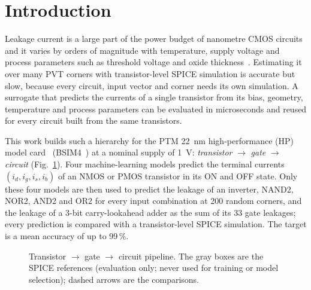 \section{Introduction}\label{sec:intro}
Leakage current is a large part of the power budget of nanometre CMOS circuits and it varies by orders of magnitude with temperature, supply voltage and process parameters such as threshold voltage and oxide thickness~\cite{roy2003}.
Estimating it over many PVT corners with transistor-level SPICE simulation is accurate but slow, because every circuit, input vector and corner needs its own simulation.
A surrogate that predicts the currents of a single transistor from its bias, geometry, temperature and process parameters can be evaluated in microseconds and reused for every circuit built from the same transistors.

This work builds such a hierarchy for the PTM \SI{22}{\nano\meter} high-performance (HP) model card~\cite{ptm,ptmweb} (BSIM4~\cite{bsim4}) at a nominal supply of \SI{1}{\volt}: \emph{transistor} $\rightarrow$ \emph{gate} $\rightarrow$ \emph{circuit} (Fig.~\ref{fig:flow}).
Four machine-learning models predict the terminal currents $(i_d,i_g,i_s,i_b)$ of an NMOS or PMOS transistor in its ON and OFF state. Only these four models are then used to predict the leakage of an inverter, NAND2, NOR2, AND2 and OR2 for every input combination at 200 random corners, and the leakage of a 3-bit carry-lookahead adder as the sum of its 33 gate leakages; every prediction is compared with a transistor-level SPICE simulation.
The target is a mean accuracy of up to 99\,\%.

\begin{figure}[t]
\centering
{}
\caption{Transistor $\rightarrow$ gate $\rightarrow$ circuit pipeline. The gray boxes are the SPICE references (evaluation only; never used for training or model selection); dashed arrows are the comparisons.}
\label{fig:flow}
\end{figure}


